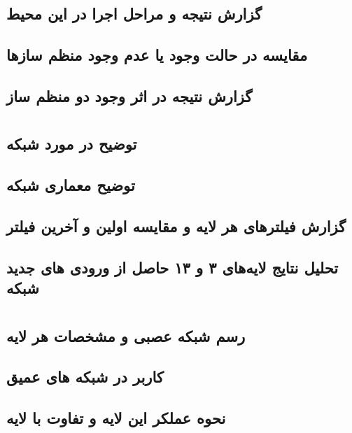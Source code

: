 \documentclass{article}
\begin{document}
\section{}
\subsection{گزارش نتیجه و مراحل اجرا در این محیط}
\subsection{مقایسه در حالت وجود یا عدم وجود منظم ساز‌ها}
\subsection{گزارش نتیجه در اثر وجود دو منظم ساز}

\section{}
\subsection{توضیح در مورد شبکه }
\subsection{توضیح معماری شبکه }
\subsection{گزارش فیلتر‌های هر لایه و مقایسه اولین و آخرین فیلتر}
\subsection{تحلیل نتایج لایه‌های ۳ و ۱۳ حاصل از ورودی های جدید شبکه}
\section{}
\subsection{رسم شبکه عصبی و مشخصات هر لایه}
\subsection{کاربر در شبکه های عمیق}
\subsection{نحوه عملکر این لایه و تفاوت با لایه }
\end{document}
